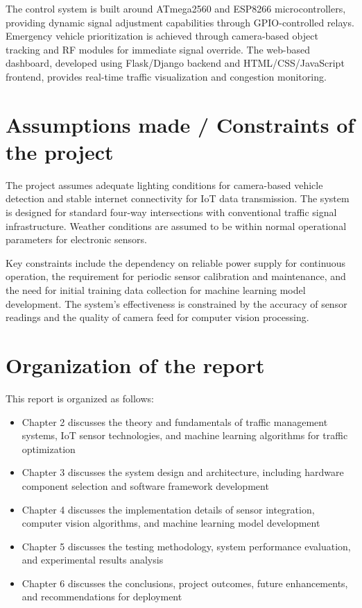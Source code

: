 \documentclass[12pt]{report}
\begin{document}
The control system is built around ATmega2560 and ESP8266 microcontrollers, providing dynamic signal adjustment capabilities through GPIO-controlled relays. Emergency vehicle prioritization is achieved through camera-based object tracking and RF modules for immediate signal override. The web-based dashboard, developed using Flask/Django backend and HTML/CSS/JavaScript frontend, provides real-time traffic visualization and congestion monitoring.

\section[Assumptions made / Constraints of the project]{\textbf{Assumptions made / Constraints of the project}}

The project assumes adequate lighting conditions for camera-based vehicle detection and stable internet connectivity for IoT data transmission. The system is designed for standard four-way intersections with conventional traffic signal infrastructure. Weather conditions are assumed to be within normal operational parameters for electronic sensors.

Key constraints include the dependency on reliable power supply for continuous operation, the requirement for periodic sensor calibration and maintenance, and the need for initial training data collection for machine learning model development. The system's effectiveness is constrained by the accuracy of sensor readings and the quality of camera feed for computer vision processing.

\section[Organization of the report]{\textbf{Organization of the report}}

This report is organized as follows:
\begin{itemize}
\item Chapter 2 discusses the theory and fundamentals of traffic management systems, IoT sensor technologies, and machine learning algorithms for traffic optimization
\item Chapter 3 discusses the system design and architecture, including hardware component selection and software framework development
\item Chapter 4 discusses the implementation details of sensor integration, computer vision algorithms, and machine learning model development
\item Chapter 5 discusses the testing methodology, system performance evaluation, and experimental results analysis
\item Chapter 6 discusses the conclusions, project outcomes, future enhancements, and recommendations for deployment
\end{itemize}
\end{document}
